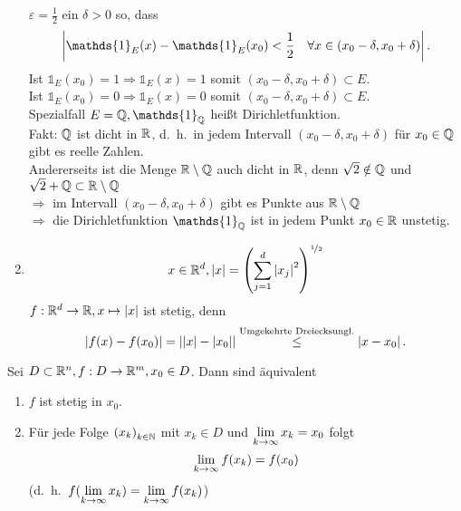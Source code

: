 \documentclass[../ana1.tex]{subfiles}
\begin{document}
\begin{bspe}
\begin{enumerate}
        \( \varepsilon = \frac{1}{2} \) ein \(\delta > 0\) so, dass
        \[ \abs{ \mathds{1}_E(x) - \mathds{1}_E(x_0) < \frac{1}{2} 
        \quad \forall x\in (x_0 - \delta, x_0 + \delta) }. \]
        Ist \( \mathds{1}_E(x_0) = 1 \Rightarrow \mathds{1}_E(x) = 1 \)
        somit \( (x_0 - \delta, x_0 + \delta) \subset E \).\\
        Ist \( \mathds{1}_E(x_0) = 0 \Rightarrow \mathds{1}_E(x) = 0 \)
        somit \( (x_0 - \delta, x_0 + \delta) \subset E \).\\
        Spezialfall \( E = \Q, \mathds{1}_\Q \) heißt Dirichletfunktion.\\
        Fakt: \( \mathbb{Q} \) ist dicht in \( \mathbb{R} \), d.\ h.\ in jedem Intervall
        \( (x_0 - \delta, x_0 + \delta) \) für \( x_0 \in\mathbb{Q} \) gibt es
        reelle Zahlen.\\
        Andererseits ist die Menge \( \mathbb{R}\setminus\mathbb{Q} \) auch dicht in \(\mathbb{R} \), 
        denn \( \sqrt{2} \notin \mathbb{Q} \) und \( \sqrt{2}+\mathbb{Q} \subset \mathbb{R}\setminus\mathbb{Q} \) \\
        \( \Rightarrow \) im Intervall \( (x_0 - \delta, x_0 + \delta) \)
        gibt es Punkte aus \( \mathbb{R}\setminus\mathbb{Q} \) \\
        \( \Rightarrow \) die Dirichletfunktion \( \mathds{1}_\Q \) ist
        in jedem Punkt \( x_0 \in\mathbb{R} \) unstetig.
        \item \[ x\in \mathbb{R}^d, \left|x\right| = 
        {\left( \sum_{j=1}^d \left|x_j\right|^2 \right)}^{\nicefrac{1}{2}} \]
        \( f:\mathbb{R}^d \rightarrow \mathbb{R}, x\mapsto \left|x\right| \) ist stetig, denn
        \[ \left| f(x) - f(x_0) \right| = \left| \left|x\right| - \left|x_0\right| \right| 
        \overset{\text{Umgekehrte Dreiecksungl.}}{\leq} \left|x - x_0\right|. \]
    \end{enumerate}
\end{bspe}
\begin{satz}
    Sei \( D\subset \mathbb{R}^n, f:D\rightarrow \mathbb{R}^m, x_0 \in D \). Dann sind
    äquivalent
    \begin{enumerate}
        \item \( f \) ist stetig in \( x_0 \).
        \item Für jede Folge \( {(x_k)}_{k\in\mathbb{N}} \) mit \( x_k \in D \)
        und \( \lim\limits_{k\rightarrow\infty} x_k = x_0 \) folgt 
        \[ \lim\limits_{k\rightarrow\infty} f(x_k) = f(x_0) \]
        (d.\ h.\  \( f(\lim\limits_{k\rightarrow\infty} x_k) = \lim\limits_{k\rightarrow\infty} f(x_k) \))
    \end{enumerate}
\end{satz}
\end{document}
